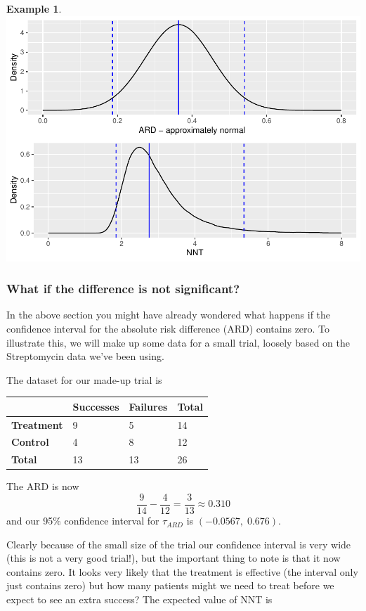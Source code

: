 \documentclass[
  openany]{book}
\theoremstyle{definition}
\theoremstyle{definition}
\newtheorem{example}{Example}[chapter]
\theoremstyle{definition}
\theoremstyle{definition}
\theoremstyle{remark}
\begin{document}
\begin{example}
\includegraphics{CT4H_notes_files/figure-latex/unnamed-chunk-28-1.pdf}
\end{example}

\subsubsection{What if the difference is not significant?}\label{what-if-the-difference-is-not-significant}

In the above section you might have already wondered what happens if the confidence interval for the absolute risk difference (ARD) contains zero. To illustrate this, we will make up some data for a small trial, loosely based on the Streptomycin data we've been using.

The dataset for our made-up trial is

\begin{longtable}[]{@{}llll@{}}
\toprule\noalign{}
& Successes & Failures & Total \\
\midrule\noalign{}
\endhead
\bottomrule\noalign{}
\endlastfoot
\textbf{Treatment} & 9 & 5 & 14 \\
\textbf{Control} & 4 & 8 & 12 \\
\textbf{Total} & 13 & 13 & 26 \\
\end{longtable}

The ARD is now
\[\frac{9}{14} - \frac{4}{12} = \frac{3}{13} \approx 0.310 \]
and our 95\% confidence interval for \(\tau_{ARD}\) is \(\left(-0.0567,\;0.676\right)\).

Clearly because of the small size of the trial our confidence interval is very wide (this is not a very good trial!), but the important thing to note is that it now contains zero. It looks very likely that the treatment is effective (the interval only just contains zero) but how many patients might we need to treat before we expect to see an extra success? The expected value of NNT is
\end{document}
